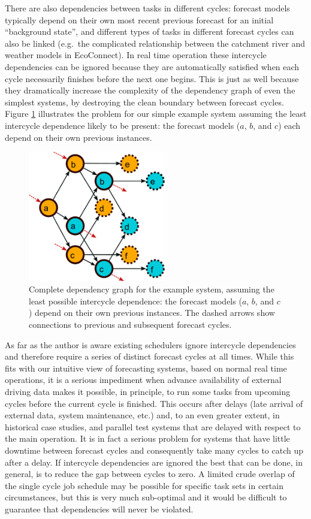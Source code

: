 \documentclass[11pt,a4paper]{article}
\begin{document}
There are also dependencies between tasks in different cycles: forecast
models typically depend on their own most recent previous forecast for
an initial ``background state'', and different types of tasks in
different forecast cycles can also be linked (e.g.\ the complicated
relationship between the catchment river and weather models in
EcoConnect). In real time operation these intercycle dependencies can be
ignored because they are automatically satisfied when each cycle
necessarily finishes before the next one begins. This is just as well
because they dramatically increase the complexity of the dependency
graph of even the simplest systems, by destroying the clean boundary
between forecast cycles. Figure \ref{fig-dep-two} illustrates the
problem for our simple example system assuming the least intercycle
dependence likely to be present: the forecast models ($a$, $b$, and $c$)
each depend on their own previous instances.

\begin{figure} \begin{center}
    \includegraphics[width=6cm]{dependencies-two} \end{center}
    \caption{\small Complete dependency graph for the example
    system, assuming the least possible intercycle dependence: the
    forecast models ($a$, $b$, and $c$) depend on their own previous
    instances. The dashed arrows show connections to previous and
    subsequent forecast cycles.} 
    \label{fig-dep-two}
\end{figure}

As far as the author is aware existing schedulers ignore intercycle
dependencies and therefore require a series of distinct forecast cycles
at all times. While this fits with our intuitive view of forecasting
systems, based on normal real time operations, it is a serious
impediment when advance availability of external driving data makes it
possible, in principle, to run some tasks from upcoming cycles before
the current cycle is finished. This occurs after delays (late arrival of
external data, system maintenance, etc.) and, to an even greater extent,
in historical case studies, and parallel test systems that are delayed
with respect to the main operation. It is in fact a serious problem for
systems that have little downtime between forecast cycles and
consequently take many cycles to catch up after a delay. If intercycle
dependencies are ignored the best that can be done, in general, is to
reduce the gap between cycles to zero. A limited crude overlap of the
single cycle job schedule may be possible for specific task sets in
certain circumstances, but this is very much sub-optimal and it would be
difficult to guarantee that dependencies will never be violated.
\end{document}
